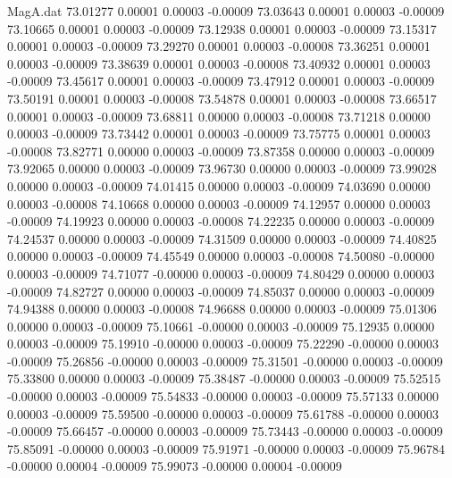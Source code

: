 \begin{filecontents}{MagA.dat}
  73.01277    0.00001    0.00003   -0.00009
  73.03643    0.00001    0.00003   -0.00009
  73.10665    0.00001    0.00003   -0.00009
  73.12938    0.00001    0.00003   -0.00009
  73.15317    0.00001    0.00003   -0.00009
  73.29270    0.00001    0.00003   -0.00008
  73.36251    0.00001    0.00003   -0.00009
  73.38639    0.00001    0.00003   -0.00008
  73.40932    0.00001    0.00003   -0.00009
  73.45617    0.00001    0.00003   -0.00009
  73.47912    0.00001    0.00003   -0.00009
  73.50191    0.00001    0.00003   -0.00008
  73.54878    0.00001    0.00003   -0.00008
  73.66517    0.00001    0.00003   -0.00009
  73.68811    0.00000    0.00003   -0.00008
  73.71218    0.00000    0.00003   -0.00009
  73.73442    0.00001    0.00003   -0.00009
  73.75775    0.00001    0.00003   -0.00008
  73.82771    0.00000    0.00003   -0.00009
  73.87358    0.00000    0.00003   -0.00009
  73.92065    0.00000    0.00003   -0.00009
  73.96730    0.00000    0.00003   -0.00009
  73.99028    0.00000    0.00003   -0.00009
  74.01415    0.00000    0.00003   -0.00009
  74.03690    0.00000    0.00003   -0.00008
  74.10668    0.00000    0.00003   -0.00009
  74.12957    0.00000    0.00003   -0.00009
  74.19923    0.00000    0.00003   -0.00008
  74.22235    0.00000    0.00003   -0.00009
  74.24537    0.00000    0.00003   -0.00009
  74.31509    0.00000    0.00003   -0.00009
  74.40825    0.00000    0.00003   -0.00009
  74.45549    0.00000    0.00003   -0.00008
  74.50080   -0.00000    0.00003   -0.00009
  74.71077   -0.00000    0.00003   -0.00009
  74.80429    0.00000    0.00003   -0.00009
  74.82727    0.00000    0.00003   -0.00009
  74.85037    0.00000    0.00003   -0.00009
  74.94388    0.00000    0.00003   -0.00008
  74.96688    0.00000    0.00003   -0.00009
  75.01306    0.00000    0.00003   -0.00009
  75.10661   -0.00000    0.00003   -0.00009
  75.12935    0.00000    0.00003   -0.00009
  75.19910   -0.00000    0.00003   -0.00009
  75.22290   -0.00000    0.00003   -0.00009
  75.26856   -0.00000    0.00003   -0.00009
  75.31501   -0.00000    0.00003   -0.00009
  75.33800    0.00000    0.00003   -0.00009
  75.38487   -0.00000    0.00003   -0.00009
  75.52515   -0.00000    0.00003   -0.00009
  75.54833   -0.00000    0.00003   -0.00009
  75.57133    0.00000    0.00003   -0.00009
  75.59500   -0.00000    0.00003   -0.00009
  75.61788   -0.00000    0.00003   -0.00009
  75.66457   -0.00000    0.00003   -0.00009
  75.73443   -0.00000    0.00003   -0.00009
  75.85091   -0.00000    0.00003   -0.00009
  75.91971   -0.00000    0.00003   -0.00009
  75.96784   -0.00000    0.00004   -0.00009
  75.99073   -0.00000    0.00004   -0.00009

\end{filecontents}
